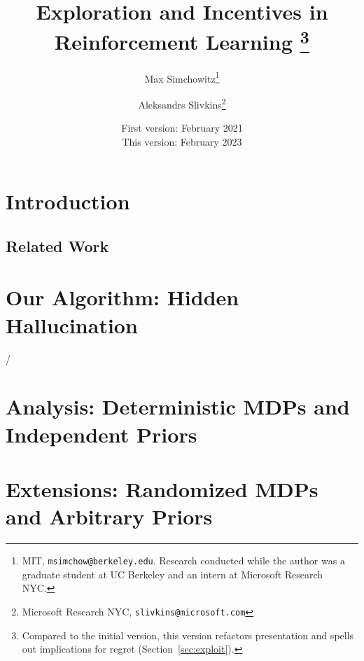 \documentclass[11pt]{article}
\title{Exploration and Incentives in Reinforcement Learning%
\footnote{Compared to the initial version, this version refactors presentation and spells out implications for regret (Section~\ref{sec:exploit}).}}
\author{Max Simchowitz\thanks{MIT, \texttt{msimchow@berkeley.edu}. Research conducted while the author was a graduate student at UC Berkeley and an intern at Microsoft Research NYC.} \and Aleksandrs Slivkins\thanks{Microsoft Research NYC, \texttt{slivkins@microsoft.com}}}
\date{First version: February 2021\\This version: February 2023}
\begin{document}
\maketitle
\vspace{-8mm}

\begin{abstract}

\end{abstract}




%

\section{Introduction}


\subsection{Related Work}\label{sec:related}


\section{Our Algorithm: Hidden Hallucination}\label{sec:alg}

/
\section{Analysis: Deterministic MDPs and Independent Priors}
\label{sec:analysis-basic}


\section{Extensions: Randomized MDPs and Arbitrary Priors}
\label{sec:extension}


%

%
\end{document}
